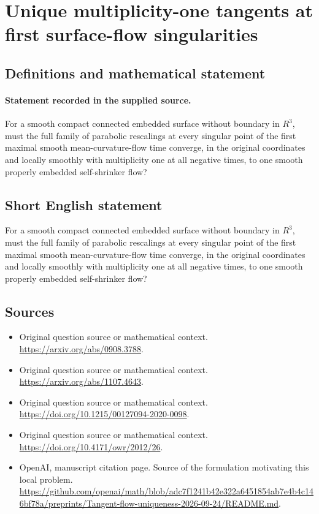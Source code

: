 \documentclass[11pt]{article}
\begin{document}
\section*{Unique multiplicity-one tangents at first surface-flow singularities}\label{statement}
\subsection{Definitions and mathematical statement}
\paragraph{Statement recorded in the supplied source.}
For a smooth compact connected embedded surface without boundary in $R^{3}$, must the full family of parabolic rescalings at every singular point of the first maximal smooth mean-curvature-flow time converge, in the original coordinates and locally smoothly with multiplicity one at all negative times, to one smooth properly embedded self-shrinker flow?
\subsection{Short English statement}
For a smooth compact connected embedded surface without boundary in $R^{3}$, must the full family of parabolic rescalings at every singular point of the first maximal smooth mean-curvature-flow time converge, in the original coordinates and locally smoothly with multiplicity one at all negative times, to one smooth properly embedded self-shrinker flow?
\subsection{Sources}
\begin{itemize}
\item[S1] Original question source or mathematical context.
\url{https://arxiv.org/abs/0908.3788}.
\item[S2] Original question source or mathematical context.
\url{https://arxiv.org/abs/1107.4643}.
\item[S3] Original question source or mathematical context.
\url{https://doi.org/10.1215/00127094-2020-0098}.
\item[S4] Original question source or mathematical context.
\url{https://doi.org/10.4171/owr/2012/26}.
\item[S5] OpenAI, manuscript citation page. Source of the formulation motivating this local problem.
\url{https://github.com/openai/math/blob/adc7f1241b42e322a6451854ab7e4b4c146bf78a/preprints/Tangent-flow-uniqueness-2026-09-24/README.md}.
\end{itemize}
\end{document}
